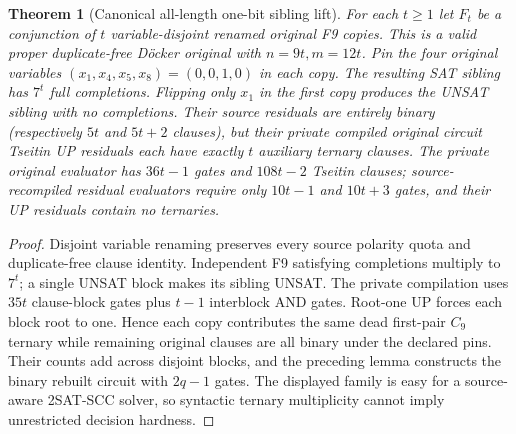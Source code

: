 \documentclass[11pt]{article}
\newtheorem{theorem}{Theorem}
\begin{document}
\begin{theorem}[Canonical all-length one-bit sibling lift]
For each $t\ge1$ let $F_t$ be a conjunction of $t$
variable-disjoint renamed original F9 copies. This is a
valid proper duplicate-free D\"ocker original with
$n=9t,m=12t$. Pin the four original variables
$(x_1,x_4,x_5,x_8)=(0,0,1,0)$ in each copy.
The resulting SAT sibling has $7^t$ full completions.
Flipping only $x_1$ in the first copy produces the
UNSAT sibling with no completions. Their source residuals
are entirely binary (respectively $5t$ and $5t+2$ clauses),
but their private compiled original circuit Tseitin
UP residuals each have exactly $t$ auxiliary ternary clauses.
The private original evaluator has $36t-1$ gates and
$108t-2$ Tseitin clauses; source-recompiled residual
evaluators require only $10t-1$ and $10t+3$ gates,
and their UP residuals contain no ternaries.
\end{theorem}
\begin{proof}
Disjoint variable renaming preserves every source
polarity quota and duplicate-free clause identity.
Independent F9 satisfying completions multiply to $7^t$;
a single UNSAT block makes its sibling UNSAT.
The private compilation uses $35t$ clause-block gates
plus $t-1$ interblock AND gates. Root-one UP forces
each block root to one. Hence each copy contributes
the same dead first-pair $C_9$ ternary while remaining
original clauses are all binary under the declared pins.
Their counts add across disjoint blocks, and the
preceding lemma constructs the binary rebuilt circuit
with $2q-1$ gates. The displayed family is easy for a
source-aware 2SAT-SCC solver, so syntactic ternary
multiplicity cannot imply unrestricted decision hardness.
\end{proof}
\end{document}

